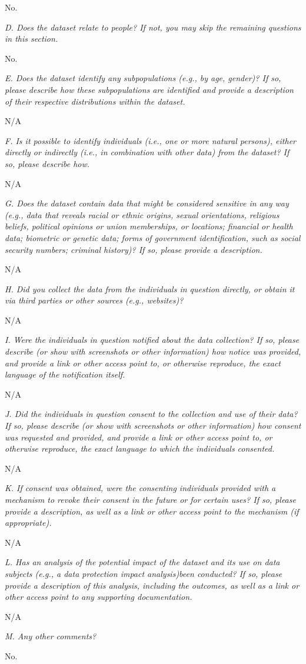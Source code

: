 \documentclass{article}
\begin{document}
No.

\textit{D. Does the dataset relate to people? If not, you may skip the remaining questions in this section.}

No.

\textit{E. Does the dataset identify any subpopulations (e.g., by age, gender)? If so, please describe how these subpopulations are identified and provide a description of their respective distributions within the dataset.}

N/A

\textit{F. Is it possible to identify individuals (i.e., one or more natural persons), either directly or indirectly (i.e., in combination with other data) from the dataset? If so, please describe how.}

N/A

\textit{G. Does the dataset contain data that might be considered sensitive in any way (e.g., data that reveals racial or ethnic origins, sexual orientations, religious beliefs, political opinions or union memberships, or locations; financial or health data; biometric or genetic data; forms of government identification, such as social security numbers; criminal history)? If so, please provide a description.
}

N/A

\textit{H. Did you collect the data from the individuals in question directly, or obtain it via third parties or other sources (e.g., websites)?}

N/A

\textit{I. Were the individuals in question notified about the data collection? If so, please describe (or show with screenshots or other information) how notice was provided, and provide a link or other access point to, or otherwise reproduce, the exact language of the notification itself.}

N/A

\textit{J. Did the individuals in question consent to the collection and use of their data? If so, please describe (or show with screenshots or other information) how consent was requested and provided, and provide a link or other access point to, or otherwise reproduce, the exact language to which the individuals consented.}

N/A

\textit{K. If consent was obtained, were the consenting individuals provided with a mechanism to revoke their consent in the future or for certain uses? If so, please provide a description, as well as a link or other access point to the mechanism (if appropriate).}

N/A

\textit{L. Has an analysis of the potential impact of the dataset and its use on data subjects (e.g., a data protection impact analysis)been conducted? If so, please provide a description of this analysis, including the outcomes, as well as a link or other access point to any supporting documentation.}

N/A

\textit{M. Any other comments?}

No.
\end{document}
